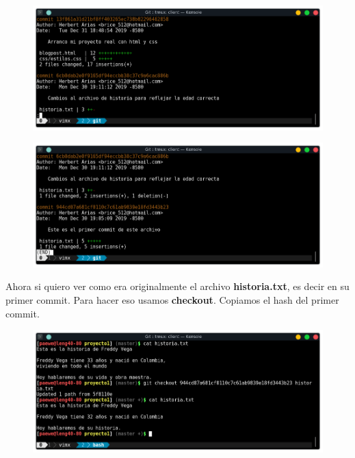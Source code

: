 \documentclass{article}
\begin{document}
\begin{figure}[h!]
  \centering
  \includegraphics[scale=0.75]{./Pictures/121_log_stat.png}
\end{figure}

\newpage

\begin{figure}[h!]
  \centering
  \includegraphics[scale=0.75]{./Pictures/122_log_stat.png}
\end{figure}

Ahora si quiero ver como era originalmente el archivo \textbf{historia.txt}, es
decir en su primer commit. Para hacer eso usamos \textbf{checkout}. Copiamos el
hash del primer commit.

\begin{figure}[h!]
  \centering
  \includegraphics[scale=0.75]{./Pictures/123_checkout_historia.png}
\end{figure}
\end{document}
